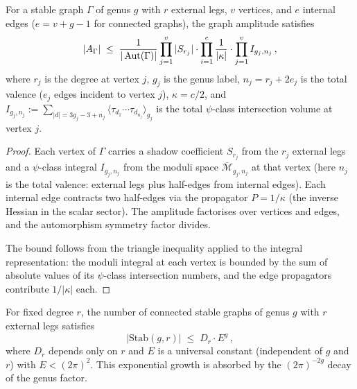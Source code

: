 \begin{proposition}
\label{prop:multi-vertex-bound}
For a stable graph $\Gamma$ of genus $g$ with $r$ external
legs, $v$ vertices, and $e$ internal edges ($e = v + g - 1$
for connected graphs), the graph amplitude satisfies
\begin{equation}\label{eq:multi-vertex-amplitude-bound}
|A_\Gamma| \;\leq\;
\frac{1}{|\operatorname{Aut}(\Gamma)|}
\prod_{j=1}^v |S_{r_j}|
\cdot \prod_{i=1}^e \frac{1}{|\kappa|}
\cdot
\prod_{j=1}^v I_{g_j, n_j}\,,
\end{equation}
where $r_j$ is the degree at vertex $j$,
$g_j$ is the genus label, $n_j = r_j + 2e_j$ is the
total valence \textup{(}$e_j$ edges incident to vertex $j$\textup{)},
$\kappa = c/2$, and
$I_{g_j,n_j} := \sum_{|d|=3g_j-3+n_j}
\langle \tau_{d_1} \cdots \tau_{d_{n_j}} \rangle_{g_j}$
is the total $\psi$-class intersection volume at vertex $j$.
\end{proposition}

\begin{proof}
Each vertex of $\Gamma$ carries a shadow coefficient $S_{r_j}$
from the $r_j$ external legs and a $\psi$-class integral
$I_{g_j, n_j}$ from the moduli space
$\overline{\mathcal{M}}_{g_j, n_j}$ at that vertex (here $n_j$
is the total valence: external legs plus half-edges from
internal edges). Each internal edge contracts two half-edges
via the propagator $P = 1/\kappa$ (the inverse Hessian in the
scalar sector). The amplitude factorises over vertices and
edges, and the automorphism symmetry factor divides.

The bound follows from the triangle inequality applied to the
integral representation: the moduli integral at each vertex is
bounded by the sum of absolute values of its $\psi$-class
intersection numbers, and the edge propagators contribute
$1/|\kappa|$ each.
\end{proof}

\begin{proposition}
\label{prop:graph-count-polynomial}
For fixed degree $r$, the number of connected stable graphs of
genus $g$ with $r$ external legs satisfies
\begin{equation}\label{eq:graph-count-fixed-r}
|\mathrm{Stab}(g, r)| \;\leq\; D_r \cdot E^g\,,
\end{equation}
where $D_r$ depends only on $r$ and $E$ is a universal constant
\textup{(}independent of $g$ and $r$\textup{)} with $E < (2\pi)^2$.
This exponential growth is absorbed by the
$(2\pi)^{-2g}$ decay of the genus factor.
\end{proposition}


